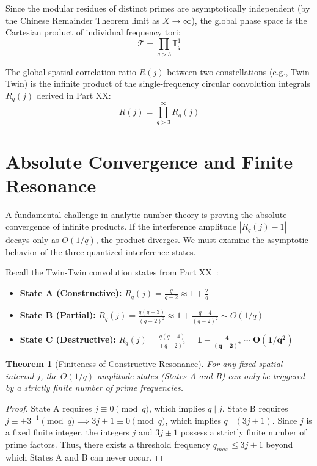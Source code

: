 \documentclass[11pt,a4paper]{article}
\newtheorem{theorem}{Theorem}
\begin{document}
Since the modular residues of distinct primes are asymptotically independent (by the Chinese Remainder Theorem limit as $X \to \infty$), the global phase space is the Cartesian product of individual frequency tori:
\begin{equation}
\mathcal{T} = \prod_{q > 3} \mathbb{T}^1_q
\end{equation}

The global spatial correlation ratio $R(j)$ between two constellations (e.g., Twin-Twin) is the infinite product of the single-frequency circular convolution integrals $R_q(j)$ derived in Part XX:
\begin{equation}
R(j) = \prod_{q > 3}^{\infty} R_q(j)
\end{equation}

\section{Absolute Convergence and Finite Resonance}

A fundamental challenge in analytic number theory is proving the absolute convergence of infinite products. If the interference amplitude $|R_q(j) - 1|$ decays only as $O(1/q)$, the product diverges. We must examine the asymptotic behavior of the three quantized interference states.

Recall the Twin-Twin convolution states from Part XX~\cite{ChenXX}:
\begin{itemize}
    \item \textbf{State A (Constructive):} $R_q(j) = \frac{q}{q-2} \approx 1 + \frac{2}{q}$
    \item \textbf{State B (Partial):} $R_q(j) = \frac{q(q-3)}{(q-2)^2} \approx 1 + \frac{q-4}{(q-2)^2} \sim O(1/q)$
    \item \textbf{State C (Destructive):} $R_q(j) = \frac{q(q-4)}{(q-2)^2} = \mathbf{1 - \frac{4}{(q-2)^2}} \sim \mathbf{O(1/q^2)}$
\end{itemize}

\begin{theorem}[Finiteness of Constructive Resonance]
For any fixed spatial interval $j$, the $O(1/q)$ amplitude states (States A and B) can only be triggered by a strictly finite number of prime frequencies.
\end{theorem}
\begin{proof}
State A requires $j \equiv 0 \pmod q$, which implies $q \mid j$. 
State B requires $j \equiv \pm 3^{-1} \pmod q \implies 3j \pm 1 \equiv 0 \pmod q$, which implies $q \mid (3j \pm 1)$.
Since $j$ is a fixed finite integer, the integers $j$ and $3j \pm 1$ possess a strictly finite number of prime factors. Thus, there exists a threshold frequency $q_{max} \le 3j+1$ beyond which States A and B can never occur.
\end{proof}
\end{document}
